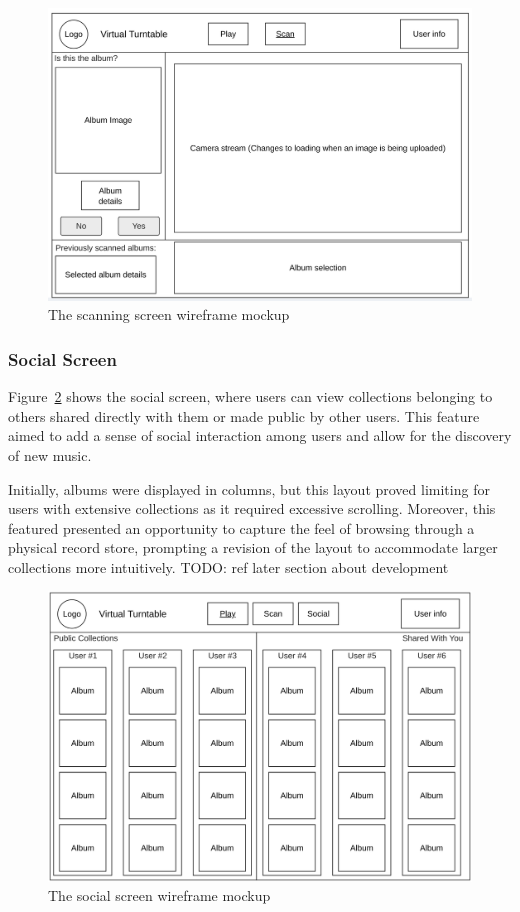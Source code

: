 \begin{figure} [H]
    \centering
    \includegraphics[width=0.6\linewidth]{figures/scan_screen_mockup.png}
    \caption{The scanning screen wireframe mockup}
    \label{fig:scan_screen_mockup}
\end{figure}


\subsubsection{Social Screen}
Figure~\ref{fig:social_screen_mockup} shows the social screen, where users can view collections belonging to others shared directly with them or made public by other users. This feature aimed to add a sense of social interaction among users and allow for the discovery of new music.

Initially, albums were displayed in columns, but this layout proved limiting for users with extensive collections as it required excessive scrolling. Moreover, this featured presented an opportunity to capture the feel of browsing through a physical record store, prompting a revision of the layout to accommodate larger collections more intuitively. TODO: ref later section about development

\begin{figure} [H]
    \centering
    \includegraphics[width=0.6\linewidth]{figures/social_screen_mockup.png}
    \caption{The social screen wireframe mockup}
    \label{fig:social_screen_mockup}
\end{figure}

